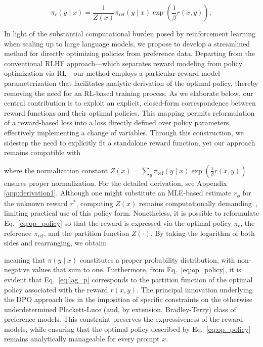 \begin{equation}\label{eq:op_policy}
    \pi_r(y\mid x) = \frac{1}{Z(x)}\pi_\text{ref}(y\mid x)\exp\left(\frac{1}{\beta}r(x, y)\right),
\end{equation}

In light of the substantial computational burden posed by reinforcement learning when scaling up to large language models, we propose to develop a streamlined method for directly optimizing policies from preference data. Departing from the conventional RLHF approach—which separates reward modeling from policy optimization via RL—our method employs a particular reward model parameterization that facilitates analytic derivation of the optimal policy, thereby removing the need for an RL-based training process. As we elaborate below, our central contribution is to exploit an explicit, closed-form correspondence between reward functions and their optimal policies. This mapping permits reformulation of a reward-based loss into a loss directly defined over policy parameters, effectively implementing a change of variables. Through this construction, we sidestep the need to explicitly fit a standalone reward function, yet our approach remains compatible with

where the normalization constant $Z(x) =\sum_{y}\pi_\text{ref}(y\mid x)\exp\left(\frac{1}{\beta}r(x, y)\right)$ ensures proper normalization. For the detailed derivation, see Appendix \ref{app:derivation1}. Although one might substitute an MLE-based estimate $r_\phi$ for the unknown reward $r^*$, computing $Z(x)$ remains computationally demanding~\citep{korbak2022reinforcement, go2023aligning}, limiting practical use of this policy form. Nonetheless, it is possible to reformulate Eq.~\ref{eq:op_policy} so that the reward is expressed via the optimal policy $\pi_r$, the reference $\pi_\text{ref}$, and the partition function $Z(\cdot)$. By taking the logarithm of both sides and rearranging, we obtain:

meaning that $\pi(y\mid x)$ constitutes a proper probability distribution, with non-negative values that sum to one. Furthermore, from Eq.~\ref{eq:op_policy}, it is evident that Eq.~\ref{eq:lag_p} corresponds to the partition function of the optimal policy associated with the reward $r(x, y)$. The principal innovation underlying the DPO approach lies in the imposition of specific constraints on the otherwise underdetermined Plackett-Luce (and, by extension, Bradley-Terry) class of preference models. This constraint preserves the expressiveness of the reward models, while ensuring that the optimal policy described by Eq.~\ref{eq:op_policy} remains analytically manageable for every prompt $x$.

